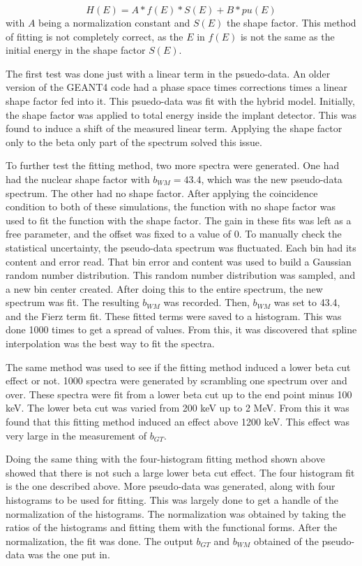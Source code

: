 \documentclass[../MaxHughesThesis.tex]{subfiles}
\begin{document}
\begin{equation}
	H(E) = A * f(E) * S(E) + B*pu(E)
	\label{eq:hybridmodel}
\end{equation}
with $A$ being a normalization constant and $S(E)$ the shape factor. 
This method of fitting is not completely correct, as the $E$ in $f(E)$ is not the same as the initial energy in the shape factor $S(E)$. 

The first test was done just with a linear term in the psuedo-data.
An older version of the GEANT4 code had a phase space times corrections times a linear shape factor fed into it.
This psuedo-data was fit with the hybrid model.
Initially, the shape factor was applied to total energy inside the implant detector.
This was found to induce a shift of the measured linear term.
Applying the shape factor only to the beta only part of the spectrum solved this issue. 

To further test the fitting method, two more spectra were generated.
One had had the nuclear shape factor with $b_{WM} = 43.4$, which was the new pseudo-data spectrum.  
The other had no shape factor.
After applying the coincidence condition to both of these simulations, the function with no shape factor was used to fit the function with the shape factor. 
The gain in these fits was left as a free parameter, and the offset was fixed to a value of 0. 
To manually check the statistical uncertainty, the pseudo-data spectrum was fluctuated.
Each bin had its content and error read. 
That bin error and content was used to build a Gaussian random number distribution.
This random number distribution was sampled, and a new bin center created.
After doing this to the entire spectrum, the new spectrum was fit.
The resulting $b_{WM}$ was recorded.
Then, $b_{WM}$ was set to 43.4, and the Fierz term fit. 
These fitted terms were saved to a histogram.
This was done 1000 times to get a spread of values.
From this, it was discovered that spline interpolation was the best way to fit the spectra.

The same method was used to see if the fitting method induced a lower beta cut effect or not. 
1000 spectra were generated by scrambling one spectrum over and over.
These spectra were fit from a lower beta cut up to the end point minus 100 keV.
The lower beta cut was varied from 200 keV up to 2 MeV.
From this it was found that this fitting method induced an effect above 1200 keV.
This effect was very large in the measurement of $b_{GT}$.

Doing the same thing with the four-histogram fitting method shown above showed that there is not such a large lower beta cut effect.
The four histogram fit is the one described above. 
More pseudo-data was generated, along with four histograms to be used for fitting.
This was largely done to get a handle of the normalization of the histograms.
The normalization was obtained by taking the ratios of the histograms and fitting them with the functional forms. 
After the normalization, the fit was done.
The output $b_{GT}$ and $b_{WM}$ obtained of the pseudo-data was the one put in.
\end{document}
